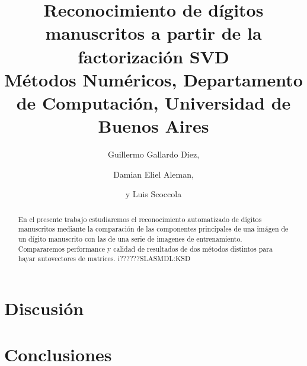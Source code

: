\documentclass[%
	compressed,
	titlepage,
	narroweqnarray,
	inline,
	twoside,
	]{ieee}
\begin{document}
\title[Reconocimiento de d\'igitos manuscritos]{%
	Reconocimiento de d\'igitos manuscritos a partir de la factorizaci\'on SVD\\
{\small M\'etodos Num\'ericos, Departamento de Computaci\'on, Universidad de Buenos Aires}
}

\author[ALEMAN, G. DIEZ Y SCOCCOLA]{
Guillermo Gallardo Diez,\and{}Damian Eliel Aleman,\and{}y Luis Scoccola
}



\maketitle               
\tableofcontents

\newpage

\begin{abstract} 
	En el presente trabajo estudiaremos el reconocimiento automatizado
	de d\'igitos manuscritos mediante la comparaci\'on de las componentes
	principales de una im\'agen de un d\'igito manuscrito con las de una
	serie de imagenes de entrenamiento.
	Compararemos performance y calidad de resultados de dos m\'etodos
	distintos para hayar autovectores de matrices. i??????SLASMDL:KSD
\end{abstract}

\begin{keywords}
\end{keywords}


 




\section{Discusi\'on}



\section{Conclusiones}
\end{document}
